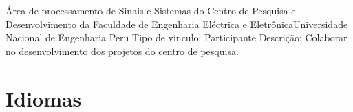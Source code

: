 \documentclass[11pt,a4paper,sans]{moderncv} %
\begin{document}
		      {Área de processamento de Sinais e Sistemas do Centro de Pesquisa e Desenvolvimento da Faculdade de 
		      Engenharia Eléctrica e Eletrônica}{Universidade Nacional de Engenharia }{Peru}
		      {Tipo de vinculo: Participante\newline{}
		      Descrição: Colaborar no desenvolvimento dos projetos do centro de pesquisa.}

		      




\section{Idiomas}

\end{document}
